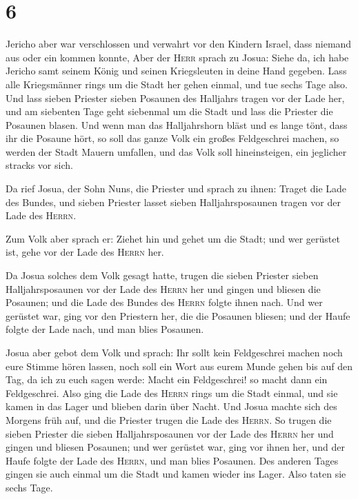 \hypertarget{section-5}{%
\section{6}\label{section-5}}

 Jericho aber war verschlossen und verwahrt vor den
Kindern Israel, dass niemand aus oder ein kommen konnte, 
Aber der \textsc{Herr} sprach zu Josua: Siehe da, ich habe Jericho samt
seinem König und seinen Kriegsleuten in deine Hand gegeben.
 Lass alle Kriegsmänner rings um die Stadt her gehen
einmal, und tue sechs Tage also.  Und lass sieben Priester
sieben Posaunen des Halljahrs tragen vor der Lade her, und am siebenten
Tage geht siebenmal um die Stadt und lass die Priester die Posaunen
blasen.  Und wenn man das Halljahrshorn bläst und es lange
tönt, dass ihr die Posaune hört, so soll das ganze Volk ein großes
Feldgeschrei machen, so werden der Stadt Mauern umfallen, und das Volk
soll hineinsteigen, ein jeglicher stracks vor sich.

 Da rief Josua, der Sohn Nuns, die Priester und sprach zu
ihnen: Traget die Lade des Bundes, und sieben Priester lasset sieben
Halljahrsposaunen tragen vor der Lade des \textsc{Herrn}.

 Zum Volk aber sprach er: Ziehet hin und gehet um die
Stadt; und wer gerüstet ist, gehe vor der Lade des \textsc{Herrn} her.

 Da Josua solches dem Volk gesagt hatte, trugen die sieben
Priester sieben Halljahrsposaunen vor der Lade des \textsc{Herrn} her
und gingen und bliesen die Posaunen; und die Lade des Bundes des
\textsc{Herrn} folgte ihnen nach.  Und wer gerüstet war,
ging vor den Priestern her, die die Posaunen bliesen; und der Haufe
folgte der Lade nach, und man blies Posaunen.

 Josua aber gebot dem Volk und sprach: Ihr sollt kein
Feldgeschrei machen noch eure Stimme hören lassen, noch soll ein Wort
aus eurem Munde gehen bis auf den Tag, da ich zu euch sagen werde: Macht
ein Feldgeschrei! so macht dann ein Feldgeschrei.  Also
ging die Lade des \textsc{Herrn} rings um die Stadt einmal, und sie
kamen in das Lager und blieben darin über Nacht.  Und
Josua machte sich des Morgens früh auf, und die Priester trugen die Lade
des \textsc{Herrn}.  So trugen die sieben Priester die
sieben Halljahrsposaunen vor der Lade des \textsc{Herrn} her und gingen
und bliesen Posaunen; und wer gerüstet war, ging vor ihnen her, und der
Haufe folgte der Lade des \textsc{Herrn}, und man blies Posaunen.
 Des anderen Tages gingen sie auch einmal um die Stadt
und kamen wieder ins Lager. Also taten sie sechs Tage.

